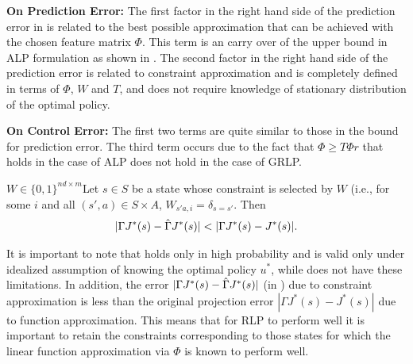 \textbf{On Prediction Error:} The first factor in the right hand side of the prediction error in  is related to the best possible approximation that can be achieved with the chosen feature matrix $\Phi$. This term is an carry over of the upper bound in ALP formulation as shown in . The second factor in the right hand side of the prediction error is related to constraint approximation and is completely defined in terms of $\Phi$, $W$ and $T$, and does not require knowledge of stationary distribution of the optimal policy.\par
\textbf{On Control Error:} The first two terms are quite similar to those in the bound for prediction error. The third term occurs due to the fact that $\Phi \geq T\Phi r$ that holds in the case of ALP does not hold in the case of GRLP.\par

\begin{corollary}\label{st}
$W\in \{0,1\}^{nd\times m}$Let $s\in S$ be a state whose constraint is selected by $W$ (i.e., for some $i$ and all $(s',a)\in S\times A$,
$W_{s'a,i}=\delta_{s=s'}$.
Then
\begin{align*}%
|\Gamma J^*(s)-\hg J^*(s)|<|\Gamma J^*(s)-J^*(s)|.
\end{align*}
\end{corollary}
It is important to note that  holds only in high probability and is valid only under idealized assumption of knowing the optimal policy $u^*$, while  does not have these limitations.
In addition, the error $|\Gamma J^*(s) -\hat{\Gamma} J^*(s)|$ (in  ) due to constraint approximation is less than the original projection error $|\Gamma J^*(s)-J^*(s)|$ due to function approximation. This means that for RLP to perform well it is important to retain the constraints corresponding to those states for which the linear function approximation via $\Phi$ is known to perform well.
\fi

